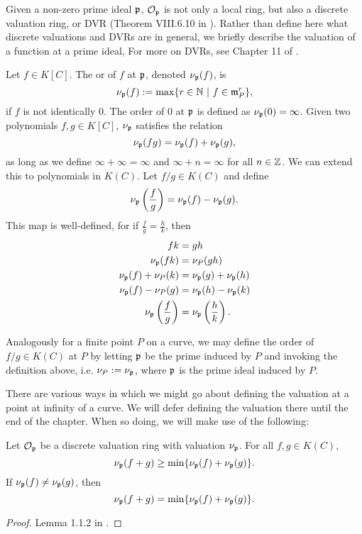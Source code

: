 Given a non-zero prime ideal $\frak p$, $\cal O_{\frak p}$ is not only a local ring,
but also a discrete valuation ring, or DVR (Theorem VIII.6.10 in \cite{hungerford}).
Rather than define here what discrete valuations and DVRs are in general,
we briefly describe the valuation of a function at a prime ideal,
For more on DVRs, see Chapter 11 of \cite{eisenbud95}.

Let $f \in K[C]$.
The  or  of $f$ at $\frak p$, denoted $\nu_{\frak p}(f)$, is
\[ \nu_{\frak p}(f) := \max\{ r \in \bb N ~|~ f \in \frak m_P^r \}, \]
if $f$ is not identically 0.
The order of 0 at $\frak p$ is defined as $\nu_{\frak p}(0) = \infty$.
Given two polynomials $f, g \in K[C]$, $\nu_{\frak p}$ satisfies the relation
\[ \nu_{\frak p}(fg) = \nu_{\frak p}(f) + \nu_{\frak p}(g), \]
as long as we define $\infty + \infty = \infty$ and $\infty + n = \infty$ for all $n \in \bb Z$.
We can extend this to polynomials in $K(C)$.
Let $f/g \in K(C)$ and define
\[ \nu_{\frak p}\left(\frac f g\right) = \nu_{\frak p}(f) - \nu_{\frak p}(g). \]
This map is well-defined,
for if $\frac f g = \frac h k$, then
\begin{align*}
  fk &= gh \\
  \nu_{\frak p}(fk) &= \nu_P(gh) \\
  \nu_{\frak p}(f) + \nu_P(k) &= \nu_{\frak p}(g) + \nu_{\frak p}(h) \\
  \nu_{\frak p}(f) - \nu_P(g) &= \nu_{\frak p}(h) - \nu_{\frak p}(k) \\
  \nu_{\frak p}\left(\frac f g\right) &= \nu_{\frak p}\left(\frac h k\right).
\end{align*}

Analogously for a finite point $P$ on a curve,
we may define the order of $f/g \in K(C)$ at $P$
by letting $\frak p$ be the prime induced by $P$ and invoking the definition above,
i.e. $\nu_P := \nu_{\frak p}$, where $\frak p$ is the prime ideal induced by $P$.

There are various ways in which we might go about defining the valuation at a point at infinity of a curve.
We will defer defining the valuation there until the end of the chapter.
When so doing, we will make use of the following:
\begin{proposition}
  \label{prop_valuation_min}
  Let $\cal O_{\frak p}$ be a discrete valuation ring with valuation $\nu_{\frak p}$.
  For all $f, g \in K(C)$,
  \[ \nu_{\frak p}(f + g) \geq \min\{ \nu_{\frak p}(f) + \nu_{\frak p}(g) \}. \]
  If $\nu_{\frak p}(f) \neq \nu_{\frak p}(g)$, then
  \[ \nu_{\frak p}(f + g) = \min\{ \nu_{\frak p}(f) + \nu_{\frak p}(g) \}. \]
\end{proposition}
\begin{proof}
  Lemma 1.1.2 in \cite{goldschmidt03}.
\end{proof}


